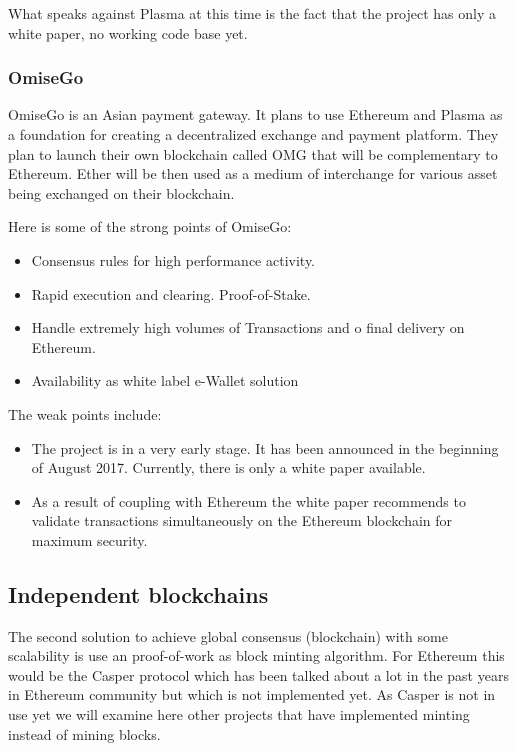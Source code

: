 What speaks against Plasma at this time is the fact that the project has only a white paper, no working code base yet.

\subsubsection{OmiseGo}
OmiseGo is an Asian payment gateway. It plans to use Ethereum and Plasma as a foundation for creating a decentralized exchange and payment platform. They plan to launch their own blockchain called OMG that will be complementary to Ethereum. Ether will be then used as a medium of interchange for various asset being exchanged on their blockchain.

Here is some of the strong points of OmiseGo:
\begin{itemize}
    \item Consensus rules for high performance activity.
    \item Rapid execution and clearing. Proof-of-Stake.
    \item Handle extremely high volumes of Transactions and o final delivery on Ethereum.
    \item Availability as white label e-Wallet solution
\end{itemize}

The weak points include:

\begin{itemize}
    \item The project is in a very early stage. It has been announced in the beginning of August 2017. Currently, there is only a white paper available.
    \item As a result of coupling with Ethereum the white paper recommends to validate transactions simultaneously on the Ethereum blockchain for maximum security.
\end{itemize}

\subsection{Independent blockchains}
The second solution to achieve global consensus (blockchain) with some scalability is use an proof-of-work as block minting algorithm. For Ethereum this would be the Casper protocol which has been talked about a lot in the past years in Ethereum community but which is not implemented yet. As Casper is not in use yet we will examine here other projects that have implemented minting instead of mining blocks.

